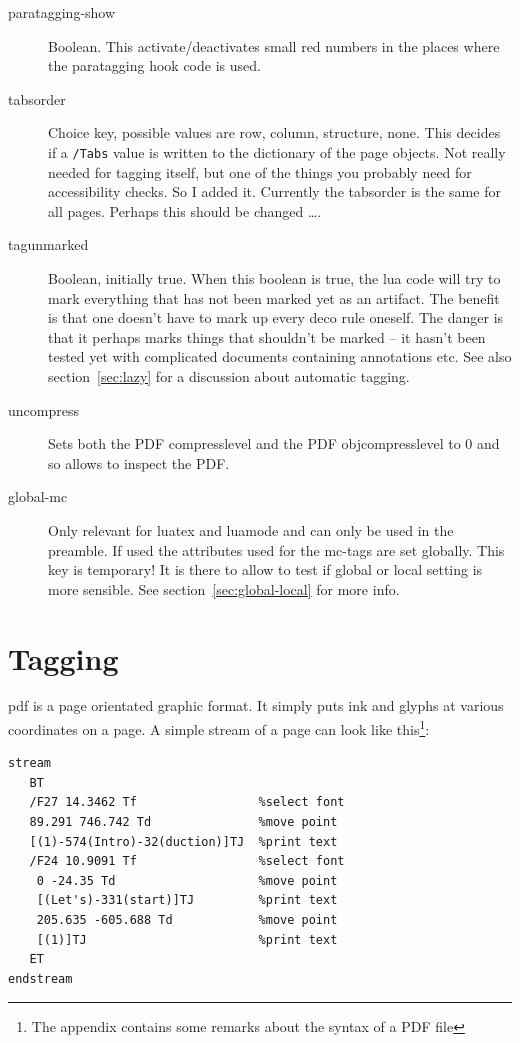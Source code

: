\documentclass[DIV=12,parskip=half-,bibliography=totoc]{scrartcl}
\newcommand\PrintKeyName[1]{\textsf{#1}}
\newcommand\PDF{PDF}
\begin{document}
\begin{description}
\item[\PrintKeyName{paratagging-show}] Boolean. This activate/deactivates small red numbers in the places where the paratagging hook code is used.


\item[\PrintKeyName{tabsorder}]
 Choice key, possible values are \PrintKeyName{row}, \PrintKeyName{column}, \PrintKeyName{structure}, \PrintKeyName{none}.  This decides if a \verb+/Tabs+ value is written to the dictionary of the page objects. Not really needed for tagging itself, but one of the things you probably need for accessibility checks. So I added it. Currently the tabsorder is the same for all pages. Perhaps this should be changed \ldots.
\item[\PrintKeyName{tagunmarked}]
 Boolean, initially true. When this boolean is true, the lua code will try to mark everything that has not been marked yet as an artifact. The benefit is that one doesn't have to mark up every deco rule oneself. The danger is that it perhaps marks things that shouldn't be marked -- it hasn't been tested yet with complicated documents containing annotations etc. See also section~\ref{sec:lazy} for a discussion about automatic tagging.
\item[\PrintKeyName{uncompress}]
 Sets both the \PDF{} compresslevel and the \PDF{} objcompresslevel to 0 and so allows to inspect the \PDF{}.

\item[\PrintKeyName{global-mc}]
 Only relevant for luatex and luamode and can only be used in the preamble. If used the attributes used for the mc-tags are set globally. This key is temporary! It is there to allow to test if global or local setting is more sensible. See section~\ref{sec:global-local} for more info.


\end{description}



\section{Tagging}


pdf is a page orientated graphic format. It simply puts ink and glyphs at various coordinates on a page. A simple stream of a page can look like this\tagpdfparaOff\footnote{The appendix contains some remarks about the syntax of a \PDF{} file}\tagpdfparaOn:

\begin{lstlisting}[columns=fixed]
stream
   BT
   /F27 14.3462 Tf                 %select font
   89.291 746.742 Td               %move point
   [(1)-574(Intro)-32(duction)]TJ  %print text
   /F24 10.9091 Tf                 %select font
    0 -24.35 Td                    %move point
    [(Let's)-331(start)]TJ         %print text
    205.635 -605.688 Td            %move point
    [(1)]TJ                        %print text
   ET
endstream
\end{lstlisting}
\end{document}
